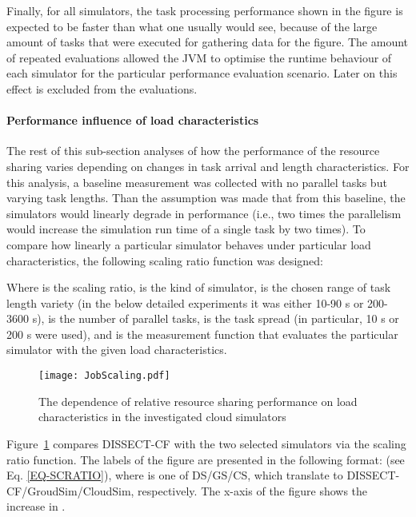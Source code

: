 \documentclass[sort, compress, 5p]{elsarticle}
\begin{document}
Finally, for all simulators, the task processing performance shown in the figure is expected to be faster than what one usually would see, because of the large amount of tasks that were executed for gathering data for the figure. The amount of repeated evaluations allowed the JVM to optimise the runtime behaviour of each simulator for the particular performance evaluation scenario. Later on this effect is excluded from the evaluations.

\paragraph{Performance influence of load characteristics}

The rest of this sub-section analyses of how the performance of the resource sharing varies depending on changes in task arrival and length characteristics. For this analysis, a baseline measurement was collected with no parallel tasks but varying task lengths. Than the assumption was made that from this baseline, the simulators would linearly degrade in performance (i.e., two times the parallelism would increase the simulation run time of a single task by two times). To compare how linearly a particular simulator behaves under particular load characteristics, the following scaling ratio function was designed:

Where  is the scaling ratio,  is the kind of simulator,  is the chosen range of task length variety (in the below detailed experiments it was either 10-90 s or 200-3600 s),  is the number of parallel tasks,  is the task spread (in particular, 10 s or 200 s were used), and  is the measurement function that evaluates the particular simulator with the given load characteristics.

\begin{figure}[tb]
\center
\texttt{[image: JobScaling.pdf]}
\caption{The dependence of relative resource sharing performance on load characteristics in the investigated cloud simulators\label{FIG-JobScalingCompare}}
\end{figure}

Figure~\ref{FIG-JobScalingCompare} compares DISSECT-CF with the two selected simulators via the scaling ratio function. The labels of the figure are presented in the following format:  (see Eq. \ref{EQ-SCRATIO}), where  is one of DS/GS/CS, which translate to DISSECT-CF/GroudSim/CloudSim, respectively. The x-axis of the figure shows the increase in .
\end{document}
